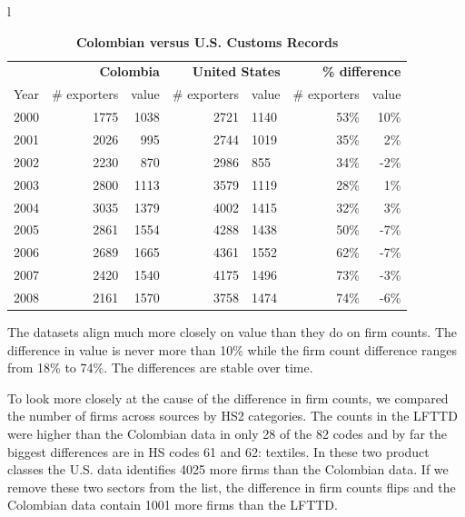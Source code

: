 \begin{table}
    \centering
{\small 
\begin{tabular}{l}
\begin{tabular}{rrrrlrr} \hline \hline 

& \multicolumn{2}{r}{\textbf{Colombia}} & \multicolumn{2}{r}{\textbf{United
States}} & \multicolumn{2}{r}{\textbf{\% difference}} \\ \cline{2-7}
Year & \# exporters & value & \# exporters & value & \# exporters & value \\ 
\hline
2000 & 1775 & 1038 & 2721 & 1140 & 53\% & 10\% \\ 
2001 & 2026 & 995 & 2744 & 1019 & 35\% & 2\% \\ 
2002 & 2230 & 870 & 2986 & 855 & 34\% & -2\% \\ 
2003 & 2800 & 1113 & 3579 & 1119 & 28\% & 1\% \\ 
2004 & 3035 & 1379 & 4002 & 1415 & 32\% & 3\% \\ 
2005 & 2861 & 1554 & 4288 & 1438 & 50\% & -7\% \\ 
2006 & 2689 & 1665 & 4361 & 1552 & 62\% & -7\% \\ 
2007 & 2420 & 1540 & 4175 & 1496 & 73\% & -3\% \\ 
2008 & 2161 & 1570 & 3758 & 1474 & 74\% & -6\% \\ \hline
\end{tabular}%
\end{tabular}%
}
\caption{\textbf{Colombian versus U.S. Customs Records}}
\label{tab:ap_dat_comp}
\end{table}

The datasets align much more closely on value than they do on firm counts.
The difference in value is never more than 10\% while the firm count
difference ranges from 18\% to 74\%. The differences are stable over time.

To look more closely at the cause of the difference in firm counts, we
compared the number of firms across sources by HS2 categories. The counts in
the LFTTD were higher than the Colombian data in only 28 of the 82 codes and
by far the biggest differences are in HS codes 61 and 62: textiles. In these
two product classes the U.S. data identifies 4025 more firms than the
Colombian data. If we remove these two sectors from the list, the difference
in firm counts flips and the Colombian data contain 1001 more firms than the
LFTTD.

